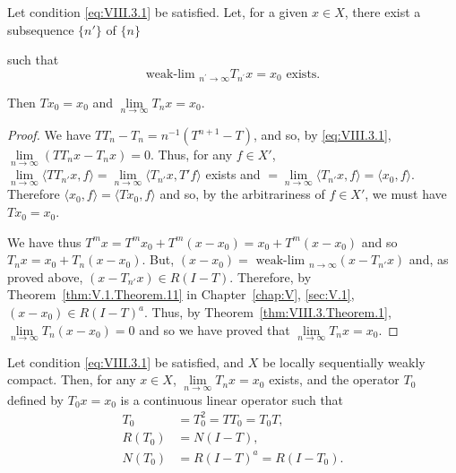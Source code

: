 \begin{theorem}\label{thm:VIII.3.Theorem.2} Let condition \eqref{eq:VIII.3.1} be satisfied. Let, for a given $x \in X$, there exist a subsequence $\{n'\}$ of $\{n\}$ 

such that 
\begin{equation}\label{eq:VIII.3.4}
\text{ weak-lim } _ {n ^{\prime} \to \infty} T _ {n ^{\prime}} x = x _{0} \text{ exists. }
\end{equation}
\end{theorem}

Then $Tx_0 = x_0$ and $\lim\limits_{n \to \infty} T_n x = x_0$. 

\begin{proof}
 We have $TT_{n} - T_{n} = n^{-1}(T^{n+1} - T)$, and so, by \eqref{eq:VIII.3.1}, $\lim\limits_{n\to \infty}(TT_nx - T_nx) = 0$. Thus, for any $f\in X'$, $\lim\limits_{n\to \infty}\langle TT_{n'}x,f\rangle = \lim\limits_{n\to \infty}\langle T_{n'}x,T'f\rangle$ exists and $= \lim\limits_{n\to \infty}\langle T_{n'}x,f\rangle = \langle x_0,f\rangle$. Therefore $\langle x_0,f\rangle = \langle Tx_0,f\rangle$ and so, by the arbitrariness of $f\in X'$, we must have $Tx_0 = x_0$. 

We have thus $T^{m}x = T^{m}x_{0} + T^{m}(x - x_{0}) = x_{0} + T^{m}(x - x_{0})$ and so $T_{n}x = x_{0} + T_{n}(x - x_{0})$. But, $(x - x_{0}) = \text{ weak-lim }_{n\to \infty}(x - T_{n'}x)$ and, as proved above, $(x - T_{n'}x)\in R(I - T)$. Therefore, by Theorem~\ref{thm:V.1.Theorem.11} in Chapter~\ref{chap:V}, \ref{sec:V.1}, $(x - x_0)\in R(I - T)^a$. Thus, by Theorem~\ref{thm:VIII.3.Theorem.1}, $\lim\limits_{n\to \infty}T_n(x - x_0) = 0$ and so we have proved that $\lim\limits_{n\to \infty}T_nx = x_0$. 
\end{proof}

\begin{corollaryu} Let condition \eqref{eq:VIII.3.1} be satisfied, and $X$ be locally sequentially weakly compact. Then, for any $x \in X$, $\lim\limits_{n \to \infty} T_n x = x_0$ exists, and the operator $T_0$ defined by $T_0 x = x_0$ is a continuous linear operator such that 
\begin{align}
T _{0}& = T _{0} ^{2} = T T _{0} = T _{0} T, \label{eq:VIII.3.5} \\
R \left(T _{0}\right)& = N (I - T), \label{eq:VIII.3.6} \\
N (T _{0})& = R (I - T) ^{a} = R (I - T _{0}). \label{eq:VIII.3.7}
\end{align}
\end{corollaryu}

